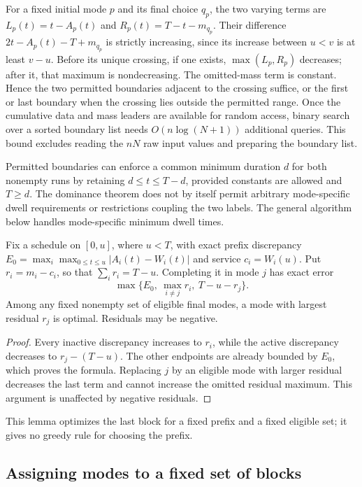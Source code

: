 For a fixed initial mode $p$ and its final choice $q_p$, the two varying
terms are $L_p(t)=t-A_p(t)$ and $R_p(t)=T-t-m_{q_p}$. Their difference
$2t-A_p(t)-T+m_{q_p}$ is strictly increasing, since its increase between
$u<v$ is at least $v-u$. Before its unique crossing, if one exists,
$\max(L_p,R_p)$ decreases; after it, that maximum is nondecreasing.
The omitted-mass term is constant. Hence the two permitted boundaries
adjacent to the crossing suffice, or the first or last boundary when the
crossing lies outside the permitted range. Once the cumulative data and mass
leaders are available for random access, binary search over a sorted
boundary list needs $O(n\log(N+1))$ additional queries. This bound excludes
reading the $nN$ raw input values and preparing the boundary list.

Permitted boundaries can enforce a common minimum duration $d$ for both
nonempty runs by retaining $d\le t\le T-d$, provided constants are allowed
and $T\ge d$. The dominance theorem does not by itself permit arbitrary
mode-specific dwell requirements or restrictions coupling the two labels.
The general algorithm below handles mode-specific minimum dwell times.

\begin{lemma}\label{lem:final-residual}
Fix a schedule on $[0,u]$, where $u<T$, with exact prefix discrepancy
$E_0=\max_i\max_{0\le t\le u}|A_i(t)-W_i(t)|$ and service $c_i=W_i(u)$.
Put $r_i=m_i-c_i$, so that $\sum_i r_i=T-u$.
Completing it in mode $j$ has exact error
\begin{equation}\label{eq:final-residual}
 \max\{E_0,\ \max_{i\ne j}r_i,\ T-u-r_j\}.
\end{equation}
Among any fixed nonempty set of eligible final modes, a mode with largest
residual $r_j$ is optimal. Residuals may be negative.
\end{lemma}
\begin{proof}
Every inactive discrepancy increases to $r_i$, while the active discrepancy
decreases to $r_j-(T-u)$. The other endpoints are already bounded by $E_0$,
which proves the formula. Replacing $j$ by an eligible mode with larger
residual decreases the last term and cannot increase the omitted residual
maximum. This argument is unaffected by negative residuals.
\end{proof}
This lemma optimizes the last block for a fixed prefix and a fixed eligible
set; it gives no greedy rule for choosing the prefix.

\subsection{Assigning modes to a fixed set of blocks}

